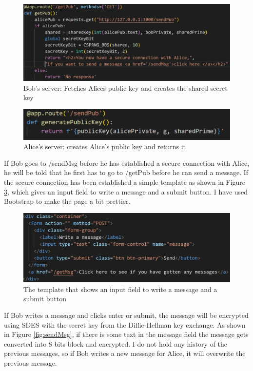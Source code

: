\documentclass[12pt, letterpaper]{article}
\begin{document}
\begin{figure}[H]
  \includegraphics[width=\linewidth]{code_snippets/getPub.PNG}
  \caption{Bob's server: Fetches Alices public key and creates the shared secret key}
  \label{fig:getPub}
\end{figure}

\begin{figure}[H]
  \includegraphics[width=\linewidth]{code_snippets/sendPub.PNG}
  \caption{Alice's server: creates Alice's public key and returns it}
  \label{fig:sendPub}
\end{figure}

If Bob goes to /sendMsg before he has established a secure connection with Alice, he will be told that he first has to go to /getPub before he can send a message. If the secure connection has been established a simple template as shown in Figure \ref{fig:temp}, which gives an input field to write a message and a submit button. I have used Bootstrap to make the page a bit prettier.

\begin{figure}[H]
  \includegraphics[width=\linewidth]{code_snippets/temp.PNG}
  \caption{The template that shows an input field to write a message and a submit button}
  \label{fig:temp}
\end{figure}

If Bob writes a message and clicks enter or submit, the message will be encrypted using SDES with the secret key from the Diffie-Hellman key exchange. As shown in Figure \ref{fig:sendMsg}, if there is some text in the message field the message gets converted into 8 bits block and encrypted. I do not hold any history of the previous messages, so if Bob writes a new message for Alice, it will overwrite the previous message.
\end{document}

